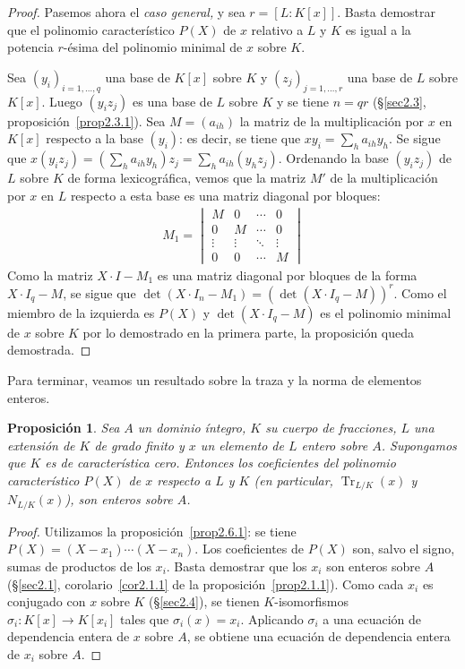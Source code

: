 \documentclass[10pt,oneside,bibtotoc,smallheadings,leqno,a5paper,DIV=12]{scrbook}
\newcommand{\QED}{}%
\renewcommand{\to}[1][]{\xrightarrow{#1}}
\DeclareMathOperator{\Tr}{Tr}
\numberwithin{equation}{section}
\theoremstyle{defi}
\theoremstyle{enonce}
\newtheorem{proposition}{Proposici\'on}
\theoremstyle{rem}
\numberwithin{theorem}{section}
\numberwithin{proposition}{section}
\numberwithin{definition}{section}
\numberwithin{lemma}{section}
\numberwithin{corollary}{section}
\numberwithin{example}{section}
\numberwithin{footnote}{section}%
\begin{document}
\begin{proof}
Pasemos ahora el {\em caso general,} y sea $r = [L:K[x]]$. Basta demostrar que el polinomio caracter\'istico
$P(X)$ de $x$ relativo a $L$ y $K$ es igual a la potencia $r$-\'esima del polinomio minimal de $x$ sobre $K$.

Sea $(y_{i})_{i=1,\dots,q}$ una base de $K[x]$ sobre $K$ y $(z_{j})_{j=1,\dots,r}$ una base de $L$ sobre $K[x]$.
Luego $(y_{i}z_{j})$ es una base de $L$ sobre $K$ y se tiene $n = qr$ (\S\ref{sec2.3}, proposici\'on~\ref{prop2.3.1}). Sea $M = (a_{ih})$ la
matriz de la multiplicaci\'on por $x$ en $K[x]$ respecto a la base $(y_{i})$: es decir, se tiene que
$xy_{i} = \sum_{h}a_{ih}y_{h}$. Se sigue que $x(y_{i}z_{j}) = \left(\sum_{h}a_{ih}y_{h}\right)z_{j}
= \sum_{h} a_{ih}(y_{h}z_{j})$. Ordenando la base $(y_{i}z_{j})$ de $L$ sobre $K$ de forma lexicogr\'afica,
vemos que la matriz $M'$ de la multiplicaci\'on por $x$ en $L$ respecto a esta base es una matriz
diagonal por bloques:
\begin{gather*}
M_{1} = \begin{vmatrix}
M & 0 & \cdots & 0\\
0 & M & \cdots & 0\\
\vdots & \vdots & \ddots & \vdots\\
0 & 0 & \cdots & M
\end{vmatrix}
\end{gather*}
Como la matriz $X\cdot I-M_{1}$ es una matriz diagonal por bloques de la forma $X\cdot I_{q}-M$, se sigue que
$\det(X\cdot I_{n}-M_{1}) = (\det(X\cdot I_{q}-M))^{r}$. Como el miembro de la izquierda es $P(X)$
y $\det(X\cdot I_{q}-M)$ es el polinomio minimal de $x$ sobre $K$ por lo demostrado en la primera parte,
la proposici\'on queda demostrada. \QED
\end{proof}

Para terminar, veamos un resultado sobre la traza y la norma de elementos enteros.

\begin{proposition}\label{prop2.6.2}
Sea $A$ un dominio \'integro, $K$ su cuerpo de fracciones, $L$ una extensi\'on de $K$ de grado finito
y $x$ un elemento de $L$ entero sobre $A$. Supongamos que $K$ es de caracter\'istica cero. Entonces los
coeficientes del polinomio caracter\'istico $P(X)$ de $x$ respecto a $L$ y $K$ (en particular, $\Tr_{L/K}(x)$
y $N_{L/K}(x)$), son enteros sobre $A$.
\end{proposition}

\begin{proof}
Utilizamos la proposici\'on~\ref{prop2.6.1}: se tiene $P(X) = (X-x_{1})\cdots(X-x_{n})$. Los coeficientes de $P(X)$ son, salvo
el signo, sumas de productos de los $x_{i}$. Basta demostrar que los $x_{i}$ son enteros sobre $A$
(\S\ref{sec2.1}, corolario~\ref{cor2.1.1} de la proposici\'on~\ref{prop2.1.1}).
Como cada $x_{i}$ es conjugado con $x$ sobre $K$ (\S\ref{sec2.4}), se tienen
$K$-isomorfismos $\sigma_{i}:K[x]\to K[x_{i}]$ tales que $\sigma_{i}(x) = x_{i}$. Aplicando $\sigma_{i}$
a una ecuaci\'on de dependencia entera de $x$ sobre $A$, se obtiene una ecuaci\'on de dependencia
entera de $x_{i}$ sobre $A$.
\end{proof}
\end{document}
